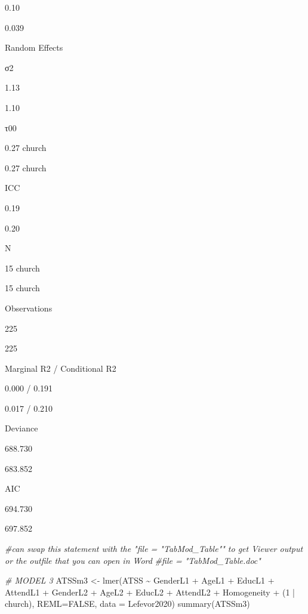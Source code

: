 \documentclass[
  english,
]{book}
\newenvironment{Shaded}{\begin{snugshade}}{\end{snugshade}}
\newcommand{\AttributeTok}[1]{\textcolor[rgb]{0.77,0.63,0.00}{#1}}
\newcommand{\CommentTok}[1]{\textcolor[rgb]{0.56,0.35,0.01}{\textit{#1}}}
\newcommand{\ConstantTok}[1]{\textcolor[rgb]{0.00,0.00,0.00}{#1}}
\newcommand{\DecValTok}[1]{\textcolor[rgb]{0.00,0.00,0.81}{#1}}
\newcommand{\FunctionTok}[1]{\textcolor[rgb]{0.00,0.00,0.00}{#1}}
\newcommand{\NormalTok}[1]{#1}
\newcommand{\OtherTok}[1]{\textcolor[rgb]{0.56,0.35,0.01}{#1}}
\newcommand{\SpecialCharTok}[1]{\textcolor[rgb]{0.00,0.00,0.00}{#1}}
\begin{document}
0.10

0.039

Random Effects

σ2

1.13

1.10

τ00

0.27 church

0.27 church

ICC

0.19

0.20

N

15 church

15 church

Observations

225

225

Marginal R2 / Conditional R2

0.000 / 0.191

0.017 / 0.210

Deviance

688.730

683.852

AIC

694.730

697.852

\begin{Shaded}
\begin{Highlighting}[]
\CommentTok{\#can swap this statement with the "file = "TabMod\_Table"" to get Viewer output or the outfile that you can open in Word}
\CommentTok{\#file = "TabMod\_Table.doc"}
\end{Highlighting}
\end{Shaded}

\begin{Shaded}
\begin{Highlighting}[]
\CommentTok{\# MODEL 3}
\NormalTok{ATSSm3 }\OtherTok{\textless{}{-}} \FunctionTok{lmer}\NormalTok{(ATSS }\SpecialCharTok{\textasciitilde{}}\NormalTok{ GenderL1 }\SpecialCharTok{+}\NormalTok{ AgeL1 }\SpecialCharTok{+}\NormalTok{ EducL1 }\SpecialCharTok{+}\NormalTok{ AttendL1 }\SpecialCharTok{+}\NormalTok{ GenderL2 }\SpecialCharTok{+}\NormalTok{ AgeL2 }\SpecialCharTok{+}\NormalTok{ EducL2 }\SpecialCharTok{+}\NormalTok{ AttendL2 }\SpecialCharTok{+}\NormalTok{ Homogeneity }\SpecialCharTok{+}\NormalTok{ (}\DecValTok{1} \SpecialCharTok{|}\NormalTok{ church), }\AttributeTok{REML=}\ConstantTok{FALSE}\NormalTok{, }\AttributeTok{data =}\NormalTok{ Lefevor2020)}
\FunctionTok{summary}\NormalTok{(ATSSm3)}
\end{Highlighting}
\end{Shaded}
\end{document}
